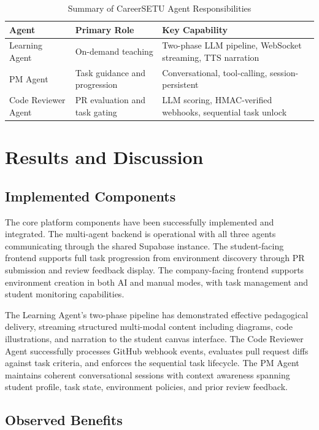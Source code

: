 \documentclass[runningheads]{llncs}
\begin{document}
\begin{table}[htbp]
\caption{Summary of CareerSETU Agent Responsibilities}
\label{tab:agents}
\centering
\begin{tabular}{p{2.2cm}p{3.2cm}p{4.5cm}}
\toprule
\textbf{Agent} & \textbf{Primary Role} & \textbf{Key Capability} \\
\midrule
Learning Agent & On-demand teaching & Two-phase LLM pipeline, WebSocket streaming, TTS narration \\
PM Agent & Task guidance and progression & Conversational, tool-calling, session-persistent \\
Code Reviewer Agent & PR evaluation and task gating & LLM scoring, HMAC-verified webhooks, sequential task unlock \\
\bottomrule
\end{tabular}
\end{table}

\section{Results and Discussion}
\label{sec:results}

\subsection{Implemented Components}

The core platform components have been successfully implemented and integrated. The multi-agent backend is operational with all three agents communicating through the shared Supabase instance. The student-facing frontend supports full task progression from environment discovery through PR submission and review feedback display. The company-facing frontend supports environment creation in both AI and manual modes, with task management and student monitoring capabilities.

The Learning Agent's two-phase pipeline has demonstrated effective pedagogical delivery, streaming structured multi-modal content including diagrams, code illustrations, and narration to the student canvas interface. The Code Reviewer Agent successfully processes GitHub webhook events, evaluates pull request diffs against task criteria, and enforces the sequential task lifecycle. The PM Agent maintains coherent conversational sessions with context awareness spanning student profile, task state, environment policies, and prior review feedback.

\subsection{Observed Benefits}
\end{document}
